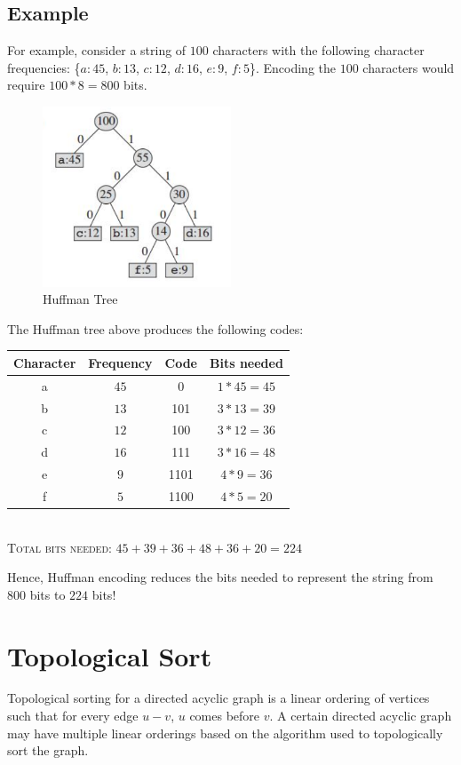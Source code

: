 \documentclass{article}
\begin{document}
\subsection{Example}
\label{eg:huffman}
For example, consider a string of $100$ characters with the following character frequencies: \{$a:45$, $b:13$, $c:12$, $d:16$, $e:9$, $f:5$\}. Encoding the $100$ characters would require $100*8=800$ bits.
\begin{figure}[H]
    \centering
    \includegraphics[width=0.5\textwidth]{huffman.png}
    \caption{Huffman Tree}
    \label{fig:huffman}
\end{figure}
The Huffman tree above produces the following codes:
\begin{center}
    \begin{tabular}{|c|c||c|c|}
        \hline
        Character & Frequency & Code & Bits needed \\
        \hline
        a & $45$ & \textsc{0} & $1*45=45$ \\
        b & $13$ & \textsc{101} & $3*13=39$ \\
        c & $12$ & \textsc{100} & $3*12=36$ \\
        d & $16$ & \textsc{111} & $3*16=48$ \\
        e & $9$ & \textsc{1101} & $4*9=36$ \\
        f & $5$ & \textsc{1100} & $4*5=20$ \\
        \hline
    \end{tabular}
    \\
    \textsc{Total bits needed}: $45+39+36+48+36+20=224$
\end{center}
Hence, Huffman encoding reduces the bits needed to represent the string from $800$ bits to $224$ bits!

\section{Topological Sort}
Topological sorting for a directed acyclic graph is a linear ordering of vertices such that for every edge $u-v$, $u$ comes before $v$. A certain directed acyclic graph may have multiple linear orderings based on the algorithm used to topologically sort the graph.
\end{document}
